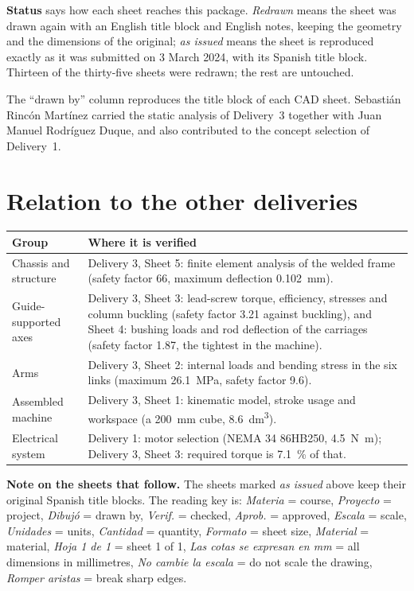 \documentclass[11pt]{article}
\begin{document}
\textbf{Status} says how each sheet reaches this package. \emph{Redrawn} means the sheet
was drawn again with an English title block and English notes, keeping the geometry and
the dimensions of the original; \emph{as issued} means the sheet is reproduced exactly as
it was submitted on 3 March 2024, with its Spanish title block. Thirteen of the
thirty-five sheets were redrawn; the rest are untouched.

The ``drawn by'' column reproduces the title block of each CAD sheet. Sebasti\'an Rinc\'on
Mart\'inez carried the static analysis of Delivery~3 together with Juan Manuel
Rodr\'iguez Duque, and also contributed to the concept selection of Delivery~1.

\section{Relation to the other deliveries}

\begin{center}
\begin{tabular}{@{}l>{\raggedright\arraybackslash}p{10.6cm}@{}}
\toprule
\textbf{Group} & \textbf{Where it is verified} \\
\midrule
Chassis and structure & Delivery 3, Sheet 5: finite element analysis of the welded frame
                        (safety factor 66, maximum deflection \SI{0.102}{\milli\metre}). \\
Guide-supported axes  & Delivery 3, Sheet 3: lead-screw torque, efficiency, stresses and
                        column buckling (safety factor 3.21 against buckling), and
                        Sheet 4: bushing loads and rod deflection of the carriages
                        (safety factor 1.87, the tightest in the machine). \\
Arms                  & Delivery 3, Sheet 2: internal loads and bending stress in the six
                        links (maximum \SI{26.1}{\mega\pascal}, safety factor 9.6). \\
Assembled machine     & Delivery 3, Sheet 1: kinematic model, stroke usage and workspace
                        (a \SI{200}{\milli\metre} cube, \SI{8.6}{\deci\metre\cubed}). \\
Electrical system     & Delivery 1: motor selection (NEMA 34 86HB250, \SI{4.5}{\newton\metre});
                        Delivery 3, Sheet 3: required torque is \SI{7.1}{\percent} of that. \\
\bottomrule
\end{tabular}
\end{center}

\vspace{6pt}
\textbf{Note on the sheets that follow.} The sheets marked \emph{as issued} above keep
their original Spanish title blocks. The reading key is: \emph{Materia} = course, \emph{Proyecto} = project,
\emph{Dibuj\'o} = drawn by, \emph{Verif.} = checked, \emph{Aprob.} = approved,
\emph{Escala} = scale, \emph{Unidades} = units, \emph{Cantidad} = quantity,
\emph{Formato} = sheet size, \emph{Material} = material, \emph{Hoja 1 de 1} = sheet 1 of 1,
\emph{Las cotas se expresan en mm} = all dimensions in millimetres, \emph{No cambie la
escala} = do not scale the drawing, \emph{Romper aristas} = break sharp edges.
\end{document}
